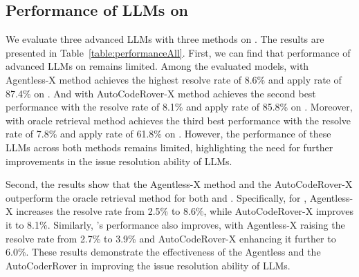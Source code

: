     





\subsection{Performance of LLMs on \Swebenchx}

We evaluate three advanced LLMs with three methods on \Swebenchx.  The results are presented in Table~\ref{table:performanceAll}. First, we can find that performance of advanced LLMs on \Swebenchx remains limited. Among the evaluated models, \GPT with Agentless-X method achieves the highest resolve rate of 8.6\% and apply rate of 87.4\% on \Swebenchx. 
And \GPT with AutoCodeRover-X method achieves the second best performance with the resolve rate of 8.1\% and apply rate of 85.8\% on \Swebenchx. 
 Moreover, \Claude with oracle retrieval method achieves the third best performance with the resolve rate of 7.8\% and apply rate of 61.8\% on \Swebenchx.
However, the performance of these LLMs across both methods remains limited,  highlighting the need for further improvements in the issue resolution ability of LLMs.


Second, the results show that the Agentless-X method and the AutoCodeRover-X outperform the oracle retrieval method for both \GPT and \DeepSeek. Specifically, for \GPT, Agentless-X increases the resolve rate from 2.5\% to 8.6\%, while AutoCodeRover-X improves it to 8.1\%. 
Similarly, \DeepSeek's performance also improves, with Agentless-X raising the resolve rate from 2.7\% to 3.9\% and AutoCodeRover-X enhancing it further to 6.0\%. These results demonstrate the effectiveness of the Agentless and the AutoCoderRover in improving the issue resolution ability of LLMs.

